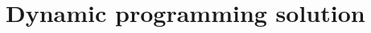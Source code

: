 \documentclass[9pt,twocolumn]{scrartcl}
\newcommand{\VM}{\textsc{VM}}
\newcommand{\Problem}{\textsc{DummyName Problem}}
\newcommand{\carlo}[1]{\textcolor{red}{carlo: #1}}
\newcommand{\ChunkType}{\tau}
\newcommand{\achunk}{\ensuremath{c}}
\begin{document}

\section{Dynamic programming solution}
\end{document}
